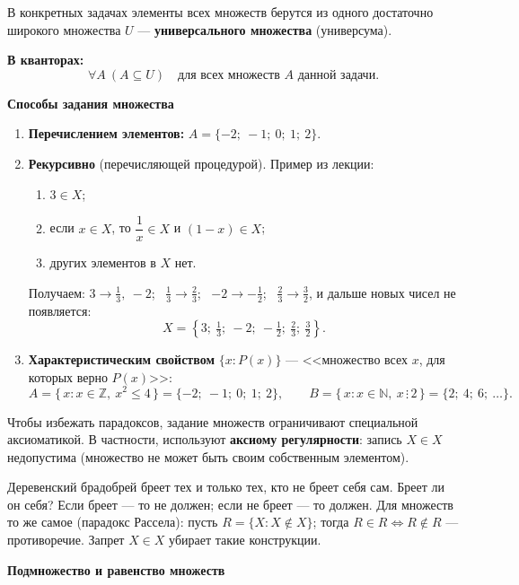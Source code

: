 \documentclass[a4paper,11pt]{article}
\newcommand{\N}{\mathbb{N}}
\newcommand{\kv}{\par\noindent\textbf{\textcolor{oprc!85!black}{В кванторах:}}}
\newcommand{\podr}[1]{\par\needspace{8\baselineskip}\medskip
  {\large\bfseries\textcolor{oprc!80!black}{#1}}\par\nopagebreak\smallskip}
\begin{document}
\begin{opr}
В конкретных задачах элементы всех множеств берутся из одного достаточно широкого множества $U$ ---
\textbf{универсального множества} (универсума).
\kv
\[
  \forall A\ (A \subseteq U) \quad \text{для всех множеств $A$ данной задачи}.
\]
\end{opr}

\podr{Способы задания множества}

\begin{enumerate}
  \item \textbf{Перечислением элементов:} $A = \{-2;\ -1;\ 0;\ 1;\ 2\}$.
  \item \textbf{Рекурсивно} (перечисляющей процедурой). Пример из лекции:
    \begin{enumerate}[label=\alph*)]
      \item $3 \in X$;
      \item если $x \in X$, то $\dfrac{1}{x} \in X$ и $(1 - x) \in X$;
      \item других элементов в $X$ нет.
    \end{enumerate}
    Получаем: $3 \to \frac13,\ -2$; \ $\frac13 \to \frac23$; \ $-2 \to -\frac12$; \ $\frac23 \to \frac32$, и дальше новых чисел не появляется:
    \[
      X = \left\{ 3;\ \tfrac{1}{3};\ -2;\ -\tfrac{1}{2};\ \tfrac{2}{3};\ \tfrac{3}{2} \right\}.
    \]
  \item \textbf{Характеристическим свойством} $\{x : P(x)\}$ --- <<множество всех $x$, для которых верно $P(x)$>>:
    \[
      A = \{\, x : x \in \mathbb{Z},\ x^{2} \le 4 \,\} = \{-2;\ -1;\ 0;\ 1;\ 2\}, \qquad
      B = \{\, x : x \in \N,\ x \,\vdots\, 2 \,\} = \{2;\ 4;\ 6;\ \dots\}.
    \]
\end{enumerate}

Чтобы избежать парадоксов, задание множеств ограничивают специальной аксиоматикой.
В частности, используют \textbf{аксиому регулярности}: запись $X \in X$ недопустима
(множество не может быть своим собственным элементом).

\begin{dop}
Деревенский брадобрей бреет тех и только тех, кто не бреет себя сам. Бреет ли он себя?
Если бреет --- то не должен; если не бреет --- то должен. Для множеств то же самое (парадокс Рассела):
пусть $R = \{X : X \notin X\}$; тогда $R \in R \Leftrightarrow R \notin R$ --- противоречие.
Запрет $X \in X$ убирает такие конструкции.
\end{dop}

\podr{Подмножество и равенство множеств}
\end{document}

